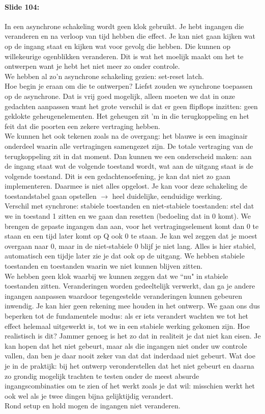 \documentclass[10pt,a4paper]{book}
\begin{document}
\paragraph{Slide 104:} In een asynchrone schakeling wordt geen klok gebruikt. Je hebt ingangen die veranderen en na verloop van tijd hebben die effect. Je kan niet gaan kijken wat op de ingang staat en kijken wat voor gevolg die hebben. Die kunnen op willekeurige ogenblikken veranderen. Dit is wat het moelijk maakt om het te ontwerpen want je hebt het niet meer zo onder controle.\\
We hebben al zo'n asynchrone schakeling gezien: set-reset latch.\\
Hoe begin je eraan om die te ontwerpen? Liefst zouden we synchrone toepassen op de asynchrone. Dat is vrij goed mogelijk, alleen moeten we dat in onze gedachten aanpassen want het grote verschil is dat er geen flipflops inzitten: geen geklokte geheugenelementen. Het geheugen zit 'm in die terugkoppeling en het feit dat die poorten een zekere vertraging hebben.\\
We kunnen het ook tekenen zoals na de overgang: het blauwe is een imaginair onderdeel waarin alle vertragingen samengezet zijn. De totale vertraging van de terugkoppeling zit in dat moment. Dan kunnen we een onderscheid maken: aan de ingang staat wat de volgende toestand wordt, wat aan de uitgang staat is de volgende toestand. Dit is een gedachtenoefening, je kan dat niet zo gaan implementeren. Daarmee is niet alles opgelost. Je kan voor deze schakeling de toestandstabel gaan opstellen $\rightarrow$ heel duidelijke, eenduidige werking.\\
Verschil met synchrone: stabiele toestanden en niet-stabiele toestanden: stel dat we in toestand 1 zitten en we gaan dan resetten (bedoeling dat in 0 komt). We brengen de gepaste ingangen dan aan, voor het vertragingselement komt dan 0 te staan en een tijd later komt op Q ook 0 te staan. Je kan wel zeggen dat je moest overgaan naar 0, maar in de niet-stabiele 0 blijf je niet lang. Alles is hier stabiel, automatisch een tijdje later zie je dat ook op de uitgang. We hebben stabiele toestanden en toestanden waarin we niet kunnen blijven zitten.\\
We hebben geen klok waarbij we kunnen zeggen dat we ``nu" in stabiele toestanden zitten. Veranderingen worden gedeeltelijk verwerkt, dan ga je andere ingangen aanpassen waardoor tegengestelde veranderingen kunnen gebeuren inwendig. Je kan hier geen rekening mee houden in het ontwerp. We gaan ons dus beperken tot de fundamentele modus: als er iets verandert wachten we tot het effect helemaal uitgewerkt is, tot we in een stabiele werking gekomen zijn. Hoe realistisch is dit? Jammer genoeg is het zo dat in realiteit je dat niet kan eisen. Je kan hopen dat het niet gebeurt, maar als die ingangen niet onder uw controle vallen, dan ben je daar nooit zeker van dat dat inderdaad niet gebeurt. Wat doe je in de praktijk: bij het ontwerp veronderstellen dat het niet gebeurt en daarna zo grondig mogelijk trachten te testen onder de meest absurde ingangscombinaties om te zien of het werkt zoals je dat wil: misschien werkt het ook wel als je twee dingen bijna gelijktijdig verandert.\\
Rond setup en hold mogen de ingangen niet veranderen.
\end{document}
